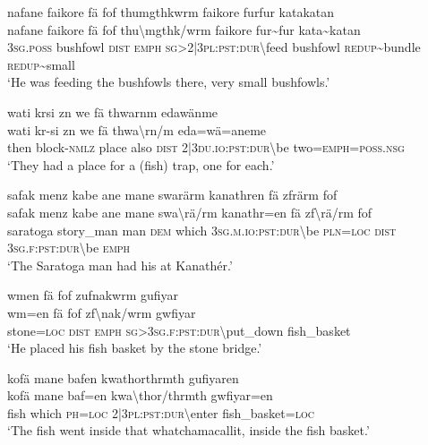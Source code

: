 \ea\label{ex:3:a7513}
nafane faikore fä fof thumgthkwrm faikore furfur katakatan\\
\gll nafane	faikore	fä	fof	thu{\textbackslash}mgthk/wrm	faikore	fur{\textasciitilde}fur	kata{\textasciitilde}katan\\
     3\textsc{sg}.\textsc{poss}	bushfowl	\textsc{dist}	\textsc{emph}	\textsc{sg}>2|3\textsc{pl}:\textsc{pst}:\textsc{dur}{\textbackslash}feed	bushfowl	\textsc{redup}{\textasciitilde}bundle	\textsc{redup}{\textasciitilde}small\\
\glt `He was feeding the bushfowls there, very small bushfowls.'
\z

\ea\label{ex:3:a7516}
wati krsi zn we fä thwarnm edawänme\\
\gll wati	kr-si	zn	we	fä	thwa{\textbackslash}rn/m	eda=wä=aneme\\
     then	block-\textsc{nmlz}	place	also	\textsc{dist}	2|3\textsc{du}.\textsc{io}:\textsc{pst}:\textsc{dur}{\textbackslash}be	two=\textsc{emph}=\textsc{poss}.\textsc{nsg}\\
\glt `They had a place for a (fish) trap, one for each.'
\z

\ea\label{ex:3:a7519}
safak menz kabe ane mane swarärm kanathren fä zfrärm fof\\
\gll safak	menz	kabe	ane	mane	swa{\textbackslash}rä/rm	kanathr=en	fä	zf{\textbackslash}rä/rm	fof\\
     saratoga	story\_man	man	\textsc{dem}	which	3\textsc{sg}.\textsc{m}.\textsc{io}:\textsc{pst}:\textsc{dur}{\textbackslash}be	\textsc{pln}=\textsc{loc}	\textsc{dist}	3\textsc{sg}.\textsc{f}:\textsc{pst}:\textsc{dur}{\textbackslash}be	\textsc{emph}\\
\glt `The Saratoga man had his at Kanathér.'
\z

\ea\label{ex:3:a7521}
wmen fä fof zufnakwrm gufiyar\\
\gll wm=en	fä	fof	zf{\textbackslash}nak/wrm	gwfiyar\\
     stone=\textsc{loc}	\textsc{dist}	\textsc{emph}	\textsc{sg}>3\textsc{sg}.\textsc{f}:\textsc{pst}:\textsc{dur}{\textbackslash}put\_down	fish\_basket\\
\glt `He placed his fish basket by the stone bridge.'
\z

\ea\label{ex:3:a7523}
kofä mane bafen kwathorthrmth gufiyaren\\
\gll kofä	mane	baf=en	kwa{\textbackslash}thor/thrmth	gwfiyar=en\\
     fish	which	\textsc{ph}=\textsc{loc}	2|3\textsc{pl}:\textsc{pst}:\textsc{dur}{\textbackslash}enter	fish\_basket=\textsc{loc}\\
\glt `The fish went inside that whatchamacallit, inside the fish basket.'
\z

